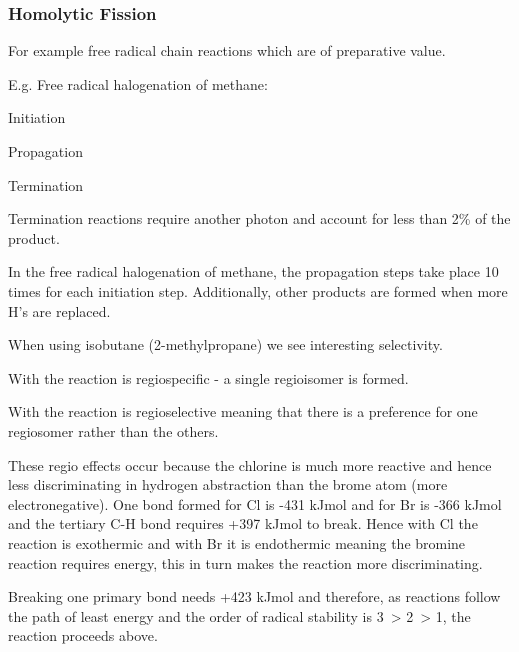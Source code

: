 \subsubsection{Homolytic Fission}

For example free radical chain reactions which are of preparative value.


E.g. Free radical halogenation of methane:


Initiation


Propagation


Termination


Termination reactions require another photon and account for less than 2\% of
the product.

In the free radical halogenation of methane, the propagation steps take place
10 times for each initiation step. Additionally, other products are formed
when more H's are replaced.

When using isobutane (2-methylpropane) we see interesting selectivity.


With  the reaction is regiospecific - a single regioisomer is formed.


With  the reaction is regioselective meaning that there is a preference
for one regiosomer rather than the others.


These regio effects occur because the chlorine is much more reactive and hence
less discriminating in hydrogen abstraction than the brome atom
(more electronegative). One  bond formed for Cl is -431 kJmol
and for Br is -366 kJmol and the tertiary C-H bond requires
+397 kJmol to break. Hence with Cl the reaction is exothermic
and with Br it is endothermic meaning the bromine reaction requires energy,
this in turn makes the reaction more discriminating.

Breaking one primary bond needs +423 kJmol and therefore, as reactions
follow the path of least energy and the order of radical stability is 3\de\
> 2\de\ > 1\de , the reaction proceeds above.
